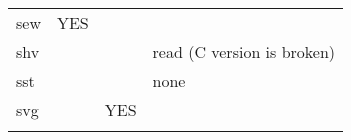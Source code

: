 \begin{longtable}[]{@{}llll@{}}
\begin{minipage}[t]{0.19\columnwidth}\raggedright
sew\strut
\end{minipage} & \begin{minipage}[t]{0.22\columnwidth}\raggedright
YES\strut
\end{minipage} & \begin{minipage}[t]{0.25\columnwidth}\raggedright
\strut
\end{minipage} & \begin{minipage}[t]{0.22\columnwidth}\raggedright
\strut
\end{minipage}\tabularnewline
\begin{minipage}[t]{0.19\columnwidth}\raggedright
shv\strut
\end{minipage} & \begin{minipage}[t]{0.22\columnwidth}\raggedright
\strut
\end{minipage} & \begin{minipage}[t]{0.25\columnwidth}\raggedright
\strut
\end{minipage} & \begin{minipage}[t]{0.22\columnwidth}\raggedright
read (C version is broken)\strut
\end{minipage}\tabularnewline
\begin{minipage}[t]{0.19\columnwidth}\raggedright
sst\strut
\end{minipage} & \begin{minipage}[t]{0.22\columnwidth}\raggedright
\strut
\end{minipage} & \begin{minipage}[t]{0.25\columnwidth}\raggedright
\strut
\end{minipage} & \begin{minipage}[t]{0.22\columnwidth}\raggedright
none\strut
\end{minipage}\tabularnewline
\begin{minipage}[t]{0.19\columnwidth}\raggedright
svg\strut
\end{minipage} & \begin{minipage}[t]{0.22\columnwidth}\raggedright
\strut
\end{minipage} & \begin{minipage}[t]{0.25\columnwidth}\raggedright
YES\strut
\end{minipage} & \begin{minipage}[t]{0.22\columnwidth}\raggedright
\strut
\end{minipage}\tabularnewline
\begin{minipage}[t]{0.19\columnwidth}\raggedright

\end{minipage}
\end{longtable}
